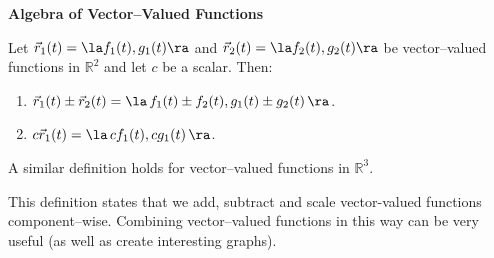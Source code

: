 \noindent\textbf{\large Algebra of Vector--Valued Functions}\\

{Let $\vec r_1(t)=\la f_1(t),g_1(t)\ra$ and $\vec r_2(t)=\la f_2(t),g_2(t)\ra$ be vector--valued functions in $\mathbb{R}^2$ and let $c$ be a scalar. Then:
\begin{enumerate}
	\item $\vec r_1(t) \pm \vec r_2(t) = \la\, f_1(t)\pm f_2(t),g_1(t)\pm g_2(t)\,\ra$.
	\item	$c\vec r_1(t) = \la\, cf_1(t),cg_1(t)\,\ra$.
\end{enumerate}
A similar definition holds for vector--valued functions in $\mathbb{R}^3$.
}

This definition states that we add, subtract and scale vector-valued functions component--wise. Combining vector--valued functions in this way can be very useful (as well as create interesting graphs).\\


